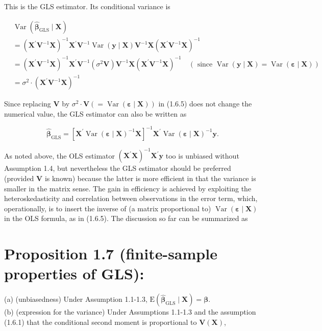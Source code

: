 \documentclass[10pt]{article}
\begin{document}
This is the GLS estimator. Its conditional variance is


\begin{align*}
& \operatorname{Var}\left(\widehat{\boldsymbol{\beta}}_{\mathrm{GLS}} \mid \mathbf{X}\right) \\
& =\left(\mathbf{X}^{\prime} \mathbf{V}^{-1} \mathbf{X}\right)^{-1} \mathbf{X}^{\prime} \mathbf{V}^{-1} \operatorname{Var}(\mathbf{y} \mid \mathbf{X}) \mathbf{V}^{-1} \mathbf{X}\left(\mathbf{X}^{\prime} \mathbf{V}^{-1} \mathbf{X}\right)^{-1} \\
& =\left(\mathbf{X}^{\prime} \mathbf{V}^{-1} \mathbf{X}\right)^{-1} \mathbf{X}^{\prime} \mathbf{V}^{-1}\left(\sigma^{2} \mathbf{V}\right) \mathbf{V}^{-1} \mathbf{X}\left(\mathbf{X}^{\prime} \mathbf{V}^{-1} \mathbf{X}\right)^{-1} \quad(\text { since } \operatorname{Var}(\mathbf{y} \mid \mathbf{X})=\operatorname{Var}(\boldsymbol{\varepsilon} \mid \mathbf{X})) \\
& =\sigma^{2} \cdot\left(\mathbf{X}^{\prime} \mathbf{V}^{-1} \mathbf{X}\right)^{-1} \tag{1.6.6}
\end{align*}


Since replacing $\mathbf{V}$ by $\sigma^{2} \cdot \mathbf{V}(=\operatorname{Var}(\boldsymbol{\varepsilon} \mid \mathbf{X}))$ in (1.6.5) does not change the numerical value, the GLS estimator can also be written as

$$
\widehat{\boldsymbol{\beta}}_{\mathrm{GLS}}=\left[\mathbf{X}^{\prime} \operatorname{Var}(\boldsymbol{\varepsilon} \mid \mathbf{X})^{-1} \mathbf{X}\right]^{-1} \mathbf{X}^{\prime} \operatorname{Var}(\boldsymbol{\varepsilon} \mid \mathbf{X})^{-1} \mathbf{y} .
$$

As noted above, the OLS estimator $\left(\mathbf{X}^{\prime} \mathbf{X}\right)^{-1} \mathbf{X}^{\prime} \mathbf{y}$ too is unbiased without Assumption 1.4, but nevertheless the GLS estimator should be preferred (provided $\mathbf{V}$ is known) because the latter is more efficient in that the variance is smaller in the matrix sense. The gain in efficiency is achieved by exploiting the heteroskedasticity and correlation between observations in the error term, which, operationally, is to insert the inverse of (a matrix proportional to) $\operatorname{Var}(\boldsymbol{\varepsilon} \mid \mathbf{X})$ in the OLS formula, as in (1.6.5). The discussion so far can be summarized as

\section*{Proposition 1.7 (finite-sample properties of GLS):}
(a) (unbiasedness) Under Assumption 1.1-1.3, $\mathrm{E}\left(\widehat{\boldsymbol{\beta}}_{\mathrm{GLS}} \mid \mathbf{X}\right)=\boldsymbol{\beta}$.\\
(b) (expression for the variance) Under Assumptions 1.1-1.3 and the assumption (1.6.1) that the conditional second moment is proportional to $\mathbf{V}(\mathbf{X})$,
\end{document}

